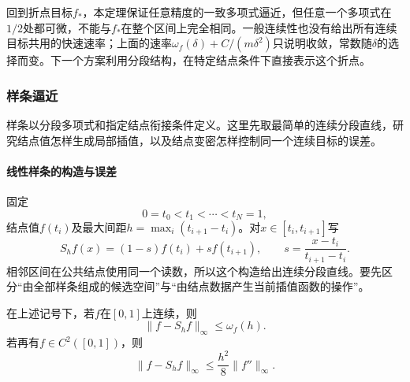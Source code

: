 回到折点目标$f_*$，本定理保证任意精度的一致多项式逼近，但任意一个多项式在$1/2$处都可微，不能与$f_*$在整个区间上完全相同。一般连续性也没有给出所有连续目标共用的快速速率；上面的速率$\omega_f(\delta)+C/(m\delta^2)$只说明收敛，常数随$\delta$的选择而变。下一个方案利用分段结构，在特定结点条件下直接表示这个折点。

\subsubsection{样条逼近}
\label{subsubsec:spline-approximation}

样条以分段多项式和指定结点衔接条件定义。这里先取最简单的连续分段直线，研究结点值怎样生成局部插值，以及结点变密怎样控制同一个连续目标的误差。

\paragraph{线性样条的构造与误差}

固定
\[
  0=t_0<t_1<\cdots<t_N=1,
\]
结点值$f(t_i)$及最大间距$h=\max_i(t_{i+1}-t_i)$。对$x\in[t_i,t_{i+1}]$写
\begin{equation}
  S_hf(x)=(1-s)f(t_i)+sf(t_{i+1}),
  \qquad s=\frac{x-t_i}{t_{i+1}-t_i}.
  \label{eq:functional-linear-spline}
\end{equation}
相邻区间在公共结点使用同一个读数，所以这个构造给出连续分段直线。要先区分“由全部样条组成的候选空间”与“由结点数据产生当前插值函数的操作”。

\begin{theorem}[线性样条的插值误差]
在上述记号下，若$f$在$[0,1]$上连续，则
\begin{equation}
  \|f-S_hf\|_\infty\le\omega_f(h).
  \label{eq:functional-spline-modulus-error}
\end{equation}
若再有$f\in C^2([0,1])$，则
\begin{equation}
  \|f-S_hf\|_\infty\le\frac{h^2}{8}\|f''\|_\infty.
  \label{eq:functional-spline-quadratic-error}
\end{equation}
\end{theorem}

